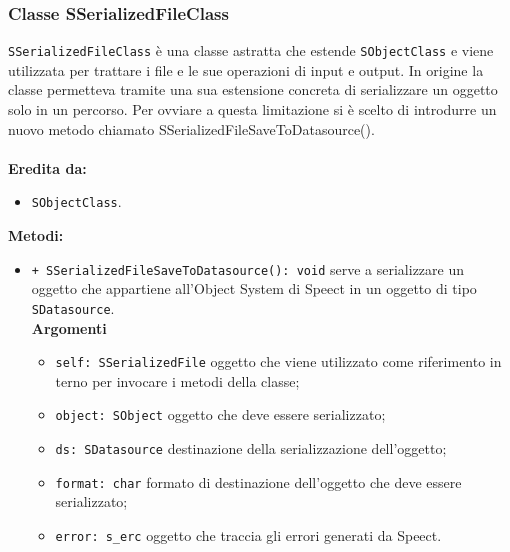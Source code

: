 \subsubsection{Classe SSerializedFileClass}
\texttt{SSerializedFileClass} è una classe astratta che estende \texttt{SObjectClass} e viene utilizzata per trattare i file e le sue operazioni di input e output.
In origine la classe permetteva tramite una sua estensione concreta di serializzare un oggetto solo in un percorso. Per ovviare a questa limitazione si è scelto di introdurre un nuovo metodo chiamato SSerializedFileSaveToDatasource().\\\\
\textbf{Eredita da:}
\begin{itemize}
	\item \texttt{SObjectClass}.
\end{itemize}
\textbf{Metodi:}
\begin{itemize}
	\item \texttt{+ SSerializedFileSaveToDatasource(): void} serve a serializzare un oggetto che appartiene all'Object System di Speect in un oggetto di tipo \texttt{SDatasource}.\\
	\textbf{Argomenti}
	\begin{itemize}
		\item \texttt{self: SSerializedFile} oggetto che viene utilizzato come riferimento in terno per invocare i metodi della classe; 
		\item \texttt{object: SObject} oggetto che deve essere serializzato;
		\item \texttt{ds: SDatasource} destinazione della serializzazione dell'oggetto;
		\item \texttt{format: char} formato di destinazione dell'oggetto che deve essere serializzato;
		\item \texttt{error: s\_erc} oggetto che traccia gli errori generati da Speect.
	\end{itemize}
\end{itemize}
 
